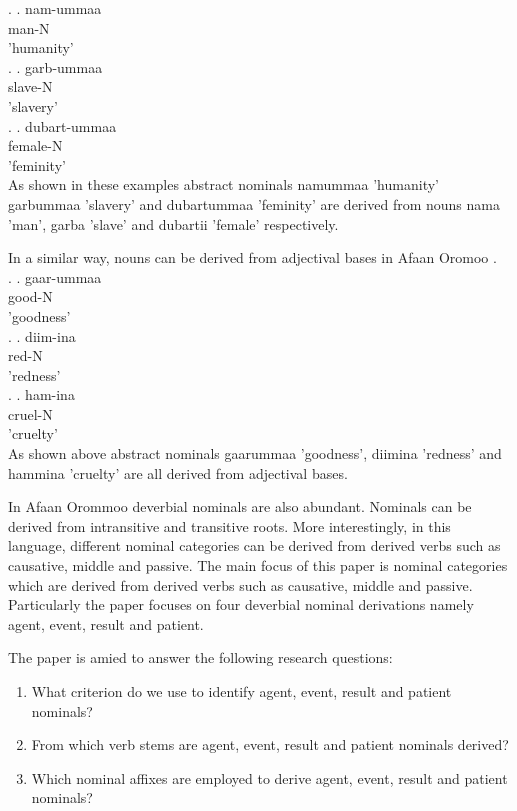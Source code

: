 \documentclass[11pt,a4paper]{article}
\begin{document}
\ex.
\ag.
nam-ummaa \\
man-N\\
'humanity'\\

\ex.
\ag.
garb-ummaa \\
slave-N\\
'slavery'\\

\ex.
\ag.
dubart-ummaa \\
female-N\\
'feminity'\\

As shown in these examples abstract nominals namummaa 'humanity' garbummaa 'slavery' and dubartummaa 'feminity' are derived from nouns nama 'man', garba 'slave' and dubartii 'female' respectively. 


In a similar way, nouns can be derived from adjectival bases in Afaan Oromoo \cite{gaddisa2001,temesgen1985,tolemariam2011,tolemariam2009}. \\

\ex.
\ag.
gaar-ummaa \\
good-N\\
'goodness'\\

\ex.
\ag.
diim-ina \\
red-N\\
'redness'\\

\ex.
\ag.
ham-ina \\
cruel-N\\
'cruelty'\\

As shown above abstract nominals gaarummaa 'goodness', diimina 'redness' and hammina 'cruelty' are all derived from adjectival bases. 

In Afaan Orommoo deverbial nominals are also abundant. Nominals can be derived from intransitive and transitive roots. More interestingly, in this language, different nominal categories can be derived from derived verbs such as causative, middle and passive. The main focus of this paper is nominal categories which are derived from derived verbs such as causative, middle and passive. Particularly the paper focuses on four deverbial nominal derivations namely agent, event, result and patient. 

The paper is amied to answer the following research questions:\\
\begin{enumerate}
	\item What criterion do we use to identify agent, event, result and patient nominals? 
	\item From which verb stems are agent, event, result and patient nominals derived?
	\item Which nominal affixes are employed to derive agent, event, result and patient nominals?
\end{enumerate}
\end{document}
